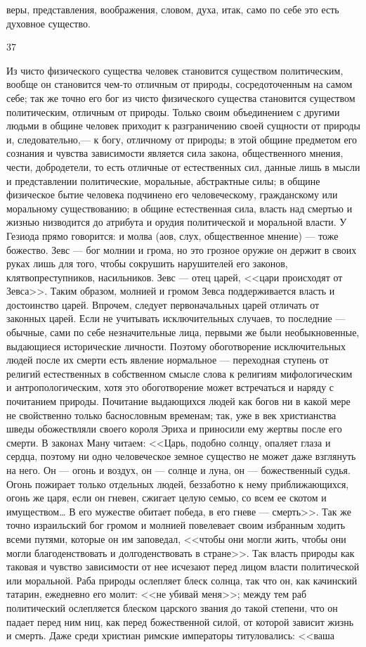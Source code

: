 \documentclass[12pt]{article}
\begin{document}
веры, представления, воображения, словом, духа, итак, само по себе это есть духовное существо.



37

Из чисто физического существа человек становится существом политическим, вообще он становится чем-то отличным от природы, сосредоточенным на самом себе; так же точно его бог из чисто физического существа становится существом политическим, отличным от природы. Только своим объединением с другими людьми в общине человек приходит к разграничению своей сущности от природы и, следовательно,--- к богу, отличному от природы; в этой общине предметом его сознания и чувства зависимости является сила закона, общественного мнения, чести, добродетели, то есть отличные от естественных сил, данные лишь в мысли и представлении политические, моральные, абстрактные силы; в общине физическое бытие человека подчинено его человеческому, гражданскому или моральному существованию; в общине естественная сила, власть над смертью и жизнью низводится до атрибута и орудия политической и моральной власти. У Гезиода прямо говорится: и молва (аов, слух, общественное мнение) --- тоже божество. Зевс --- бог молнии и грома, но это грозное оружие он держит в своих руках лишь для того, чтобы сокрушить нарушителей его законов, клятвопреступников, насильников. Зевс --- отец царей, <<цари происходят от Зевса>>. Таким образом, молнией и громом Зевса поддерживается власть и достоинство царей. Впрочем, следует первоначальных царей отличать от законных царей. Если не учитывать исключительных случаев, то последние --- обычные, сами по себе незначительные лица, первыми же были необыкновенные, выдающиеся исторические личности. Поэтому обоготворение исключительных людей после их смерти есть явление нормальное --- переходная ступень от религий естественных в собственном смысле слова к религиям мифологическим и антропологическим, хотя это обоготворение может встречаться и наряду с почитанием природы. Почитание выдающихся людей как богов ни в какой мере не свойственно только баснословным временам; так, уже в век христианства шведы обожествляли своего короля Эриха и приносили ему жертвы после его смерти. В законах Ману читаем: <<Царь, подобно солнцу, опаляет глаза и сердца, поэтому ни одно человеческое земное существо не может даже взглянуть на него. Он --- огонь и воздух, он --- солнце и луна, он --- божественный судья. Огонь пожирает только отдельных людей, беззаботно к нему приближающихся, огонь же царя, если он гневен, сжигает целую семью, со всем ее скотом и имуществом… В его мужестве обитает победа, в его гневе --- смерть>>. Так же точно израильский бог громом и молнией повелевает своим избранным ходить всеми путями, которые он им заповедал, <<чтобы они могли жить, чтобы они могли благоденствовать и долгоденствовать в стране>>. Так власть природы как таковая и чувство зависимости от нее исчезают перед лицом власти политической или моральной. Раба природы ослепляет блеск солнца, так что он, как качинский татарин, ежедневно его молит: <<не убивай меня>>; между тем раб политический ослепляется блеском царского звания до такой степени, что он падает перед ним ниц, как перед божественной силой, от которой зависит жизнь и смерть. Даже среди христиан римские императоры титуловались: <<ваша 
\end{document}
